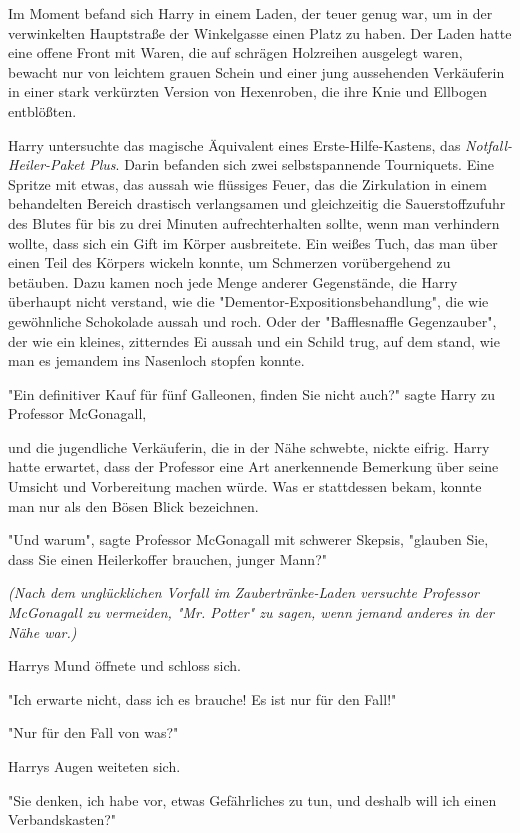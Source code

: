{Im Moment befand sich Harry in einem Laden, der teuer genug war, um in der verwinkelten Hauptstraße der Winkelgasse einen Platz zu haben. Der Laden hatte eine offene Front mit Waren, die auf schrägen Holzreihen ausgelegt waren, bewacht nur von leichtem grauen Schein und einer jung aussehenden Verkäuferin in einer stark verkürzten Version von Hexenroben, die ihre Knie und Ellbogen entblößten.

Harry untersuchte das magische Äquivalent eines Erste-Hilfe-Kastens, das \emph{Notfall-Heiler-Paket Plus}. Darin befanden sich zwei selbstspannende Tourniquets. Eine Spritze mit etwas, das aussah wie flüssiges Feuer, das die Zirkulation in einem behandelten Bereich drastisch verlangsamen und gleichzeitig die Sauerstoffzufuhr des Blutes für bis zu drei Minuten aufrechterhalten sollte, wenn man verhindern wollte, dass sich ein Gift im Körper ausbreitete. Ein weißes Tuch, das man über einen Teil des Körpers wickeln konnte, um Schmerzen vorübergehend zu betäuben. Dazu kamen noch jede Menge anderer Gegenstände, die Harry überhaupt nicht verstand, wie die "Dementor-Expositionsbehandlung", die wie gewöhnliche Schokolade aussah und roch. Oder der "Bafflesnaffle Gegenzauber", der wie ein kleines, zitterndes Ei aussah und ein Schild trug, auf dem stand, wie man es jemandem ins Nasenloch stopfen konnte.

"Ein definitiver Kauf für fünf Galleonen, finden Sie nicht auch?" sagte Harry zu Professor McGonagall,

und die jugendliche Verkäuferin, die in der Nähe schwebte, nickte eifrig. Harry hatte erwartet, dass der Professor eine Art anerkennende Bemerkung über seine Umsicht und Vorbereitung machen würde. Was er stattdessen bekam, konnte man nur als den Bösen Blick bezeichnen.

"Und warum", sagte Professor McGonagall mit schwerer Skepsis, "glauben Sie, dass Sie einen Heilerkoffer brauchen, junger Mann?"

\emph{(Nach dem unglücklichen Vorfall im Zaubertränke-Laden versuchte Professor McGonagall zu vermeiden, "Mr. Potter" zu sagen, wenn jemand anderes in der Nähe war.)}

Harrys Mund öffnete und schloss sich.

"Ich erwarte nicht, dass ich es brauche! Es ist nur für den Fall!"

"Nur für den Fall von was?"

Harrys Augen weiteten sich.

"Sie denken, ich habe vor, etwas Gefährliches zu tun, und deshalb will ich einen Verbandskasten?"

}
